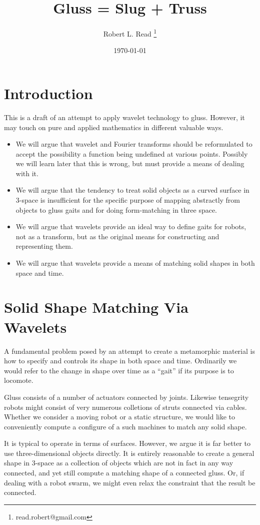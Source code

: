 \documentclass[11pt]{article}
\title{Gluss = Slug + Truss}
\author{Robert L. Read
  \thanks{read.robert@gmail.com}
}
\affil{Founder, Public Invention, an educational non-profit.}
\date{\today}
\begin{document}
\maketitle


\section{Introduction}

This is a draft of an attempt to apply wavelet technology to gluss.
However, it may touch on pure and applied mathematics in different valuable ways.
\begin{itemize}  
\item We will argue that wavelet and Fourier transforms should be reformulated to
  accept the possibility a function being undefined at various points. Possibly we will
  learn later that this is wrong, but must provide a means of dealing with it.
\item We will argue that the tendency to treat solid objects as a curved surface in 3-space
  is insufficient for the specific purpose of mapping abstractly from objects to gluss gaits
  and for doing form-matching in three space.
\item We will argue that wavelets provide an ideal way to define gaits for robots,
  not as a transform, but as the original means for constructing and representing them.
\item We will argue that wavelets provide a means of matching solid shapes in both space and time.
\end{itemize}  

\section{Solid Shape Matching Via Wavelets}

A fundamental problem posed by an attempt to create a metamorphic material is how to specify and controls
its shape in both space and time. Ordinarily we would refer to the change in shape over time as a ``gait''
if its purpose is to locomote.

Gluss consists of a number of actuators connected by joints.  Likewise tensegrity robots might consist
of very numerous colletions of struts connected via cables. Whether we consider a moving robot or
a static structure, we would like to conveniently compute a configure of a such machines to match
any solid shape.

It is typical to operate in terms of surfaces. However, we argue it is far better to use three-dimensional
objects directly. It is entirely reasonable to create a general shape in 3-space as a collection of
objects which are not in fact in any way connected, and yet still compute a matching shape of a
connected gluss.  Or, if dealing with a robot swarm, we might even relax the constraint that the result
be connected.
\end{document}
